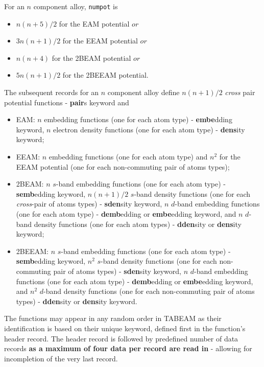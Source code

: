 For an $n$ component alloy, {\tt numpot} is
\begin{itemize}
\item $n(n+5)/2$ for the EAM potential $or$
\item $3n(n+1)/2$ for the EEAM potential $or$
\item $n(n+4)$ for the 2BEAM potential $or$
\item $5n(n+1)/2$ for the 2BEEAM potential.
\end{itemize}

The subsequent records for an $n$ component alloy define $n(n+1)/2$
{\em cross} pair potential functions - {\bf pair}s keyword and
\begin{itemize}
\item EAM: $n$ embedding functions (one for each atom type) - {\bf embe}dding keyword,
$n$ electron density functions (one for each atom type) - {\bf dens}ity keyword;
\item EEAM: $n$ embedding functions (one for each atom type) and
$n^{2}$ for the EEAM potential (one for each non-commuting pair of atoms types);
\item 2BEAM: $n$ $s$-band embedding functions (one for each atom type)
- {\bf semb}edding keyword,
$n(n+1)/2$ $s$-band density functions (one for each {\em cross}-pair of atoms types)
- {\bf sden}sity keyword,
$n$ $d$-band embedding functions (one for each atom type)
- {\bf demb}edding or {\bf embe}edding keyword, and
$n$ $d$-band density functions (one for each atom types)
- {\bf dden}sity or {\bf dens}ity keyword;
\item 2BEEAM: $n$ $s$-band embedding functions (one for each atom type)
- {\bf semb}edding keyword,
$n^{2}$ $s$-band density functions (one for each non-commuting pair of atoms types)
- {\bf sden}sity keyword,
$n$ $d$-band embedding functions (one for each atom type)
- {\bf demb}edding or {\bf embe}edding keyword, and
$n^{2}$ $d$-band density functions (one for each non-commuting pair of atoms types)
- {\bf dden}sity or {\bf dens}ity keyword.
\end{itemize}

The functions may appear in any random order in TABEAM as their identification
is based on their unique keyword, defined first in the function's header record.
The header record is followed by predefined number of data records {\bf as a maximum
of four data per record are read in} - allowing for incompletion of the very last record.

